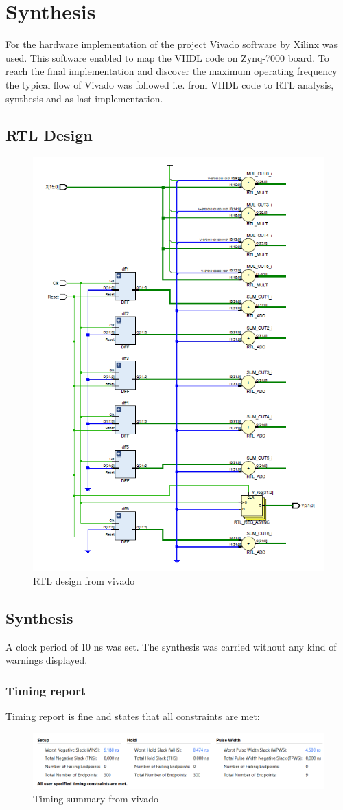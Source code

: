 \section{Synthesis} %
For the hardware implementation of the project Vivado software by Xilinx was used. This software enabled to map the VHDL code on Zynq-7000 board. To reach the final implementation and discover the maximum operating frequency the typical flow of Vivado was followed i.e. from VHDL code to RTL analysis, synthesis and as last implementation.
\label{sec:synthesis_and_implementation}
\subsection{RTL Design}
\begin{figure}[H]
  \centering
  \includegraphics[width=0.5\linewidth]{./images/schematic.PNG}
  \caption{RTL design from vivado}
  \label{fig:schematic}
\end{figure}
\subsection{Synthesis}
A clock period of 10 ns was set. The synthesis was carried without any kind of warnings displayed.\\

\subsubsection{Timing report} %
\label{ssub:timing_report}
Timing report is fine and states that all constraints are met:
\begin{figure}[H]
  \centering
  \includegraphics[width=0.9\linewidth]{./images/timing.PNG}
  \caption{Timing summary from vivado}
  \label{fig:timing}
\end{figure}


